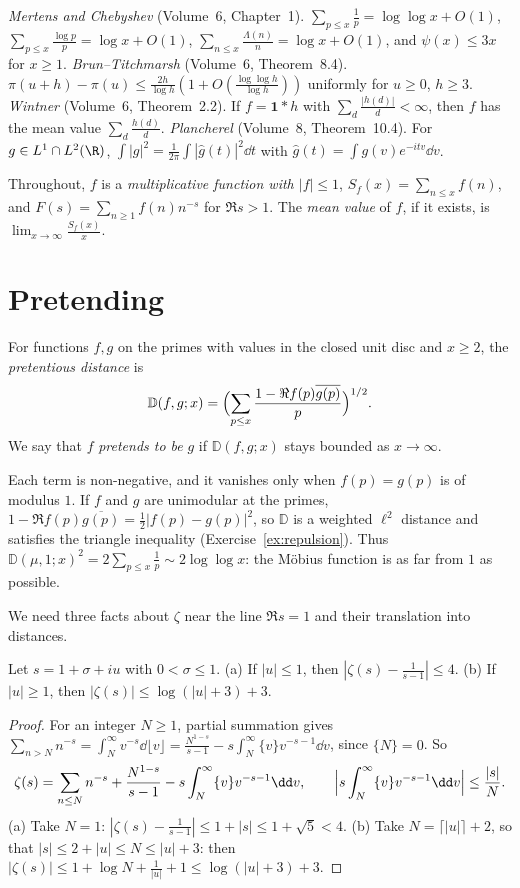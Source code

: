 \begin{reminder}
\emph{Mertens and Chebyshev} (Volume~6, Chapter~1). $\sum_{p\le x}\frac1p=\log\log x+O(1)$, $\sum_{p\le x}\frac{\log p}p=\log x+O(1)$, $\sum_{n\le x}\frac{\Lambda(n)}n=\log x+O(1)$, and $\psi(x)\le3x$ for $x\ge1$.
\emph{Brun--Titchmarsh} (Volume~6, Theorem~8.4). $\pi(u+h)-\pi(u)\le\frac{2h}{\log h}(1+O(\frac{\log\log h}{\log h}))$ uniformly for $u\ge0$, $h\ge3$.
\emph{Wintner} (Volume~6, Theorem~2.2). If $f=\mathbf1*h$ with $\sum_d\frac{|h(d)|}d<\infty$, then $f$ has the mean value $\sum_d\frac{h(d)}d$.
\emph{Plancherel} (Volume~8, Theorem~10.4). For $g\in L^1\cap L^2(\R)$, $\int|g|^2=\frac1{2\pi}\int|\hat g(t)|^2\dd t$ with $\hat g(t)=\int g(v)e^{-itv}\dd v$.
\end{reminder}

Throughout, $f$ is a \emph{multiplicative function with $|f|\le1$}, $S_f(x)=\sum_{n\le x}f(n)$, and $F(s)=\sum_{n\ge1}f(n)n^{-s}$ for $\Re s>1$. The \emph{mean value} of $f$, if it exists, is $\lim_{x\to\infty}\frac{S_f(x)}x$.

\section{Pretending}

\begin{definition}\label{def:pretend}
For functions $f,g$ on the primes with values in the closed unit disc and $x\ge2$, the \emph{pretentious distance} is
\[
\mathbb D(f,g;x)=\Bigl(\sum_{p\le x}\frac{1-\Re f(p)\overline{g(p)}}p\Bigr)^{1/2}.
\]
We say that $f$ \emph{pretends to be} $g$ if $\mathbb D(f,g;x)$ stays bounded as $x\to\infty$.
\end{definition}

Each term is non-negative, and it vanishes only when $f(p)=g(p)$ is of modulus $1$. If $f$ and $g$ are unimodular at the primes, $1-\Re f(p)\overline{g(p)}=\frac12|f(p)-g(p)|^2$, so $\mathbb D$ is a weighted $\ell^2$ distance and satisfies the triangle inequality (Exercise~\ref{ex:repulsion}). Thus $\mathbb D(\mu,1;x)^2=2\sum_{p\le x}\frac1p\sim2\log\log x$: the Möbius function is as far from $1$ as possible.

We need three facts about $\zeta$ near the line $\Re s=1$ and their translation into distances.

\begin{lemma}\label{lem:zetanear}
Let $s=1+\sigma+iu$ with $0<\sigma\le1$. (a) If $|u|\le1$, then $|\zeta(s)-\frac1{s-1}|\le4$. (b) If $|u|\ge1$, then $|\zeta(s)|\le\log(|u|+3)+3$.
\end{lemma}
\begin{proof}
For an integer $N\ge1$, partial summation gives $\sum_{n>N}n^{-s}=\int_N^\infty v^{-s}\dd\lfloor v\rfloor=\frac{N^{1-s}}{s-1}-s\int_N^\infty\{v\}v^{-s-1}\dd v$, since $\{N\}=0$. So
\[
\zeta(s)=\sum_{n\le N}n^{-s}+\frac{N^{1-s}}{s-1}-s\int_N^\infty\{v\}v^{-s-1}\dd v,\qquad\Bigl|s\int_N^\infty\{v\}v^{-s-1}\dd v\Bigr|\le\frac{|s|}N.
\]
(a) Take $N=1$: $|\zeta(s)-\frac1{s-1}|\le1+|s|\le1+\sqrt5<4$. (b) Take $N=\lceil|u|\rceil+2$, so that $|s|\le2+|u|\le N\le|u|+3$: then $|\zeta(s)|\le1+\log N+\frac1{|u|}+1\le\log(|u|+3)+3$.
\end{proof}


